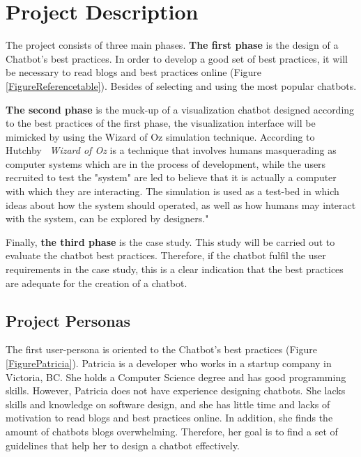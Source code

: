 \documentclass[a4paper,10pt]{article}
\begin{document}

\section*{Project Description}

The project consists of three main phases. \textbf{The first phase} is the design of a Chatbot's best practices. In order to develop a good set of best practices, it will be necessary to read blogs and best practices online (Figure \ref{FigureReferencetable}). Besides of selecting and using the most popular chatbots. 

\textbf{The second phase} is the muck-up of a visualization chatbot designed according to the best practices of the first phase, the visualization interface will be mimicked by using the Wizard of Oz simulation technique. According to Hutchby~\cite{Hutchby2001} \textit{Wizard of Oz} is a technique that involves humans masquerading as computer systems which are in the process of development, while the users recruited to test the "system" are led to believe that it is actually a computer with which they are interacting.  The simulation is used as a test-bed in which ideas about how the system should operated, as well as how humans may interact with the system, can be explored by designers." 

Finally, \textbf{the third phase} is the case study. This study will be carried out to evaluate the chatbot best practices. Therefore, if the chatbot fulfil the user requirements in the case study, this is a clear indication that the best practices are adequate for the creation of a chatbot.


 

\subsection*{Project Personas}

The first user-persona is oriented to the Chatbot's best practices (Figure \ref{FigurePatricia}). Patricia is a developer who works in a startup company in Victoria, BC. She holds a Computer Science degree and has good programming skills. However, Patricia does not have experience designing chatbots. She lacks skills and knowledge on software design, and she has little time and lacks of motivation to read blogs and best practices online. In addition, she finds the amount of chatbots blogs overwhelming. Therefore, her goal is to find a set of guidelines that help her to design a chatbot effectively. 
\end{document}
